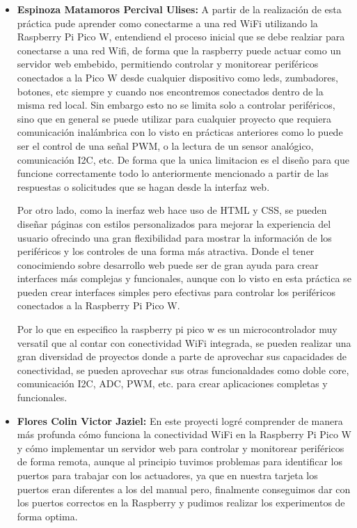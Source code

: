 \documentclass[letterpaper,12pt]{article}
\begin{document}
    \begin{itemize}
        \item \textbf{Espinoza Matamoros Percival Ulises:} A partir de la realización de esta práctica pude aprender como conectarme a una red WiFi utilizando la Raspberry Pi Pico W, entendiend el proceso inicial que se debe realziar para conectarse a una red Wifi, de forma que la raspberry puede actuar como un servidor web embebido, permitiendo controlar y monitorear periféricos conectados a la Pico W desde cualquier dispositivo como leds, zumbadores, botones, etc siempre y cuando nos encontremos conectados dentro de la misma red local. Sin embargo esto no se limita solo a controlar periféricos, sino que en general se puede utilizar para cualquier proyecto que requiera comunicación inalámbrica con lo visto en prácticas anteriores como lo puede ser el control de una señal PWM, o la lectura de un sensor analógico, comunicación I2C, etc. De forma que la unica limitacion es el diseño para que funcione correctamente todo lo anteriormente mencionado a partir de las respuestas o solicitudes que se hagan desde la interfaz web.
        
        Por otro lado, como la inerfaz web hace uso de HTML y CSS, se pueden diseñar páginas con estilos personalizados para mejorar la experiencia del usuario ofrecindo una gran flexibilidad para mostrar la información de los periféricos y los controles de una forma más atractiva. Donde el tener conocimiendo sobre desarrollo web puede ser de gran ayuda para crear interfaces más complejas y funcionales, aunque con lo visto en esta práctica se pueden crear interfaces simples pero efectivas para controlar los periféricos conectados a la Raspberry Pi Pico W.

        Por lo que en especifico la raspberry pi pico w es un microcontrolador muy versatil que al contar con conectividad WiFi integrada, se pueden realizar una gran diversidad de proyectos donde a parte de aprovechar sus capacidades de conectividad, se pueden aprovechar sus otras funcionaldades como doble core, comunicación I2C, ADC, PWM, etc. para crear aplicaciones completas y funcionales.
        
        \item \textbf{Flores Colin Victor Jaziel:} En este proyecti logré comprender de manera más profunda cómo funciona la conectividad WiFi en la Raspberry Pi Pico W y cómo implementar un servidor web para controlar y monitorear periféricos de forma remota, aunque al principio tuvimos problemas para identificar los puertos para trabajar con los actuadores, ya que en nuestra tarjeta los puertos eran diferentes a los del manual pero, finalmente conseguimos dar con los puertos correctos en la Raspberry y pudimos realizar los experimentos de forma optima.
        

\end{itemize}
\end{document}
